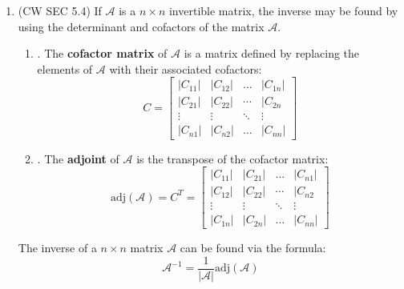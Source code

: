 \documentclass[12pt]{article}
\begin{document}
\begin{enumerate}
\begin{enumerate}
		\item\underline{} (CW SEC 5.4)
		If $\mathcal{A}$ is a $n\times n$ invertible matrix, the inverse may be found by using the determinant and cofactors
		of the matrix $\mathcal{A}$.
		\begin{enumerate}
			\item\underline{}.
			The \textbf{cofactor matrix} of $\mathcal{A}$ is a matrix defined by replacing the elements of $\mathcal{A}$ with their associated
			cofactors:
			\[C = \begin{bmatrix}	
			|C_{11}|	&|C_{12}|	 &\dots    &|C_{1n}|	\\
			|C_{21}|   &|C_{22}|	&\cdots &|C_{2n}		\\
			\vdots	   &\vdots		 &\ddots  &\vdots 	\\
			|C_{n1}|   & |C_{n2}|   & \dots   & |C_{nn}|	\end{bmatrix}\]
			\item\underline{}.
			The \textbf{adjoint} of $\mathcal{A}$ is the transpose of the cofactor matrix:
			\[\text{adj}(\mathcal{A})=C^T=\begin{bmatrix}	
			|C_{11}|	&|C_{21}|	 &\dots    &|C_{n1}|	\\
			|C_{12}|   &|C_{22}|	&\cdots &|C_{n2}		\\
			\vdots	   &\vdots		 &\ddots  &\vdots 	\\
			|C_{1n}|   & |C_{2n}|   & \dots   & |C_{nn}|	\end{bmatrix}\]
		\end{enumerate}
		The inverse of a $n\times n$ matrix $\mathcal{A}$ can be found via the formula:
		\[\mathcal{A}^{-1}=\frac{1}{|\mathcal{A}|}\text{adj}(\mathcal{A})\]
		

\end{enumerate}
\end{enumerate}
\end{document}
